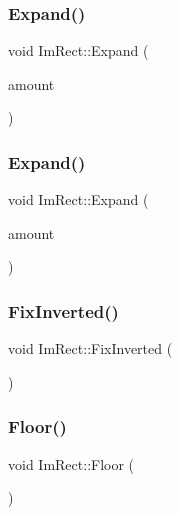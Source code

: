 \subsubsection{\texorpdfstring{Expand()}{Expand()}\hspace{0.1cm}{\footnotesize\ttfamily [1/2]}}
{\footnotesize\ttfamily void Im\+Rect\+::\+Expand (\begin{DoxyParamCaption}\item[{const float}]{amount }\end{DoxyParamCaption})}

\hypertarget{struct_im_rect_ac0b0b88fe65725b4694cd7d91d42d382}{}\label{struct_im_rect_ac0b0b88fe65725b4694cd7d91d42d382} 
\subsubsection{\texorpdfstring{Expand()}{Expand()}\hspace{0.1cm}{\footnotesize\ttfamily [2/2]}}
{\footnotesize\ttfamily void Im\+Rect\+::\+Expand (\begin{DoxyParamCaption}\item[{const \hyperlink{struct_im_vec2}{Im\+Vec2} \&}]{amount }\end{DoxyParamCaption})}

\hypertarget{struct_im_rect_a4953af0924e672abfd15c0ccf16f4607}{}\label{struct_im_rect_a4953af0924e672abfd15c0ccf16f4607} 
\subsubsection{\texorpdfstring{Fix\+Inverted()}{FixInverted()}}
{\footnotesize\ttfamily void Im\+Rect\+::\+Fix\+Inverted (\begin{DoxyParamCaption}{ }\end{DoxyParamCaption})}

\hypertarget{struct_im_rect_a8fdf75a0c64ff29f65113cd9f8be77ab}{}\label{struct_im_rect_a8fdf75a0c64ff29f65113cd9f8be77ab} 
\subsubsection{\texorpdfstring{Floor()}{Floor()}}
{\footnotesize\ttfamily void Im\+Rect\+::\+Floor (\begin{DoxyParamCaption}{ }\end{DoxyParamCaption})}

